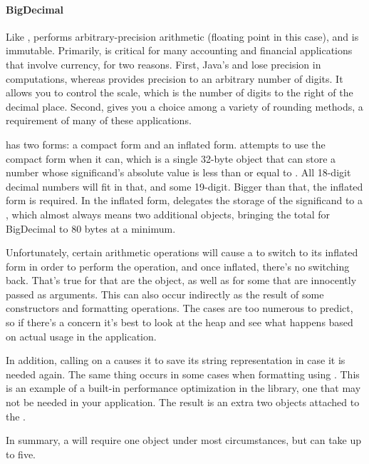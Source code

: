 \paragraph{BigDecimal} Like ,
 performs arbitrary-precision
arithmetic (floating point in this case), and is immutable.
Primarily,  is critical for many accounting
and financial applications that involve currency, for two reasons. First, Java's
 and  lose precision in computations, whereas
 provides precision to an arbitrary number of digits. 
It allows you to control the scale, which is the number of digits to the right
of the decimal place. Second,  gives you a choice
among a variety of rounding
methods, a requirement of many of these applications.

 has two forms: a compact form and an
inflated form.  attempts to use the compact
form when it can, which is a single 32-byte object that can store a number whose
significand's absolute value is less than or equal to .
All 18-digit decimal numbers will fit in that, and some 19-digit.  Bigger than
that, the inflated form is required. In the inflated form, 
delegates the storage of the significand to a , which almost always means two additional
objects, bringing the total for BigDecimal to 80 bytes at a
minimum.  

Unfortunately, certain arithmetic operations will cause a
 to switch to its inflated form in order to perform the
operation, and once inflated, there's no switching back.  That's true for
 that are the  object, as well as for some that are innocently passed
as arguments. This can also occur indirectly as the result of some constructors
and formatting operations. The cases are too numerous to predict, so if there's a concern it's
best to look at the heap and see what happens based on actual usage in the application.

In addition, calling  on a  causes it to
save its string representation in case it is needed again. The same thing occurs
in some cases when formatting using . This is an example of
a built-in performance optimization in the library, one that may not be needed
in your application. The result is an
extra two objects attached to the .

In summary, a  will require one
object under most circumstances, but can take up to five. 

